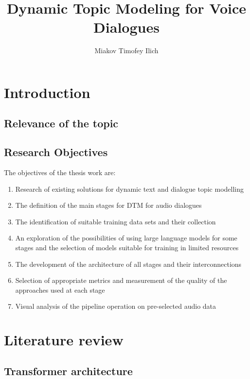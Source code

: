 \documentclass[PMI,VKR]{HSEUniversity}
\title{Dynamic Topic Modeling for Voice Dialogues}
\author{Miakov Timofey Ilich}
\begin{document}
\maketitle

\chapter{Introduction}



\section{Relevance of the topic}



\section{Research Objectives}

The objectives of the thesis work are:
\begin{enumerate}
    \item Research of existing solutions for dynamic text and dialogue topic modelling
    \item The definition of the main stages for DTM for audio dialogues
    \item The identification of suitable training data sets and their collection
    \item An exploration of the possibilities of using large language models for some stages and the selection of models suitable for training in limited resources
    \item The development of the architecture of all stages and their interconnections
    \item Selection of appropriate metrics and measurement of the quality of the approaches used at each stage
    \item Visual analysis of the pipeline operation on pre-selected audio data
\end{enumerate}


\chapter{Literature review}

\section{Transformer architecture}
\end{document}
